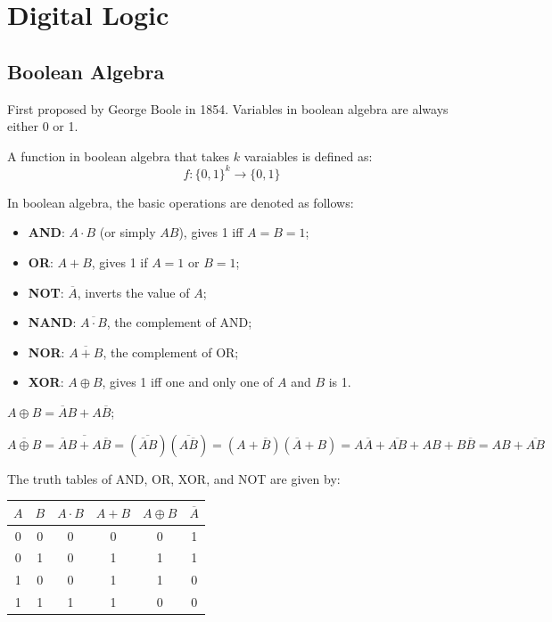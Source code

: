 \section{Digital Logic}

\subsection{Boolean Algebra}
First proposed by George Boole in 1854.
Variables in boolean algebra are always either 0 or 1.

\begin{definition}\label{def:boolean-function}
    A function in boolean algebra that takes $k$ varaiables is defined as:
    \begin{equation*}
        f: \{0,1\}^k \rightarrow \{0,1\}
    \end{equation*}
\end{definition}

\begin{definition}
    In boolean algebra, the basic operations are denoted as follows:
    \begin{itemize}
        \item \textbf{AND}: $A\cdot B$ (or simply $AB$), gives 1 iff $A=B=1$;
        \item \textbf{OR}:  $A+B$, gives 1 if $A=1$ or $B=1$;
        \item \textbf{NOT}: $\overline{A}$, inverts the value of $A$;
        \item \textbf{NAND}: $\overline{A\cdot B}$, the complement of AND;
        \item \textbf{NOR}: $\overline{A+B}$, the complement of OR;
        \item \textbf{XOR}: $A\oplus B$, gives 1 iff one and only one of $A$ and $B$ is 1.
    \end{itemize}
\end{definition}

\begin{remark}
    $A\oplus B = \overline{A}B + A\overline{B}$;

    $\overline{A\oplus B} = \overline{\overline{A}B + A\overline{B}}
    = (\overline{\overline{A}B})(\overline{A\overline{B}}) = (A+\overline{B})(\overline{A}+B)
    = A\overline{A}+\overline{AB}+AB+B\overline{B} = AB+\overline{AB}$
\end{remark}

The truth tables of AND, OR, XOR, and NOT are given by:
\begin{table}[h]
\centering
\begin{tabular}{|c|c||c|c|c|c|}
    \hline
    $A$ & $B$ & $A\cdot B$ & $A+B$ & $A\oplus B$ & $\overline{A}$\\
    \hline
    0 & 0 & 0 & 0 & 0 & 1 \\
    0 & 1 & 0 & 1 & 1 & 1 \\
    1 & 0 & 0 & 1 & 1 & 0 \\
    1 & 1 & 1 & 1 & 0 & 0 \\
    \hline
\end{tabular}
\end{table}

